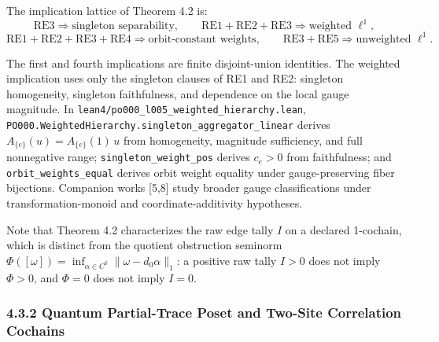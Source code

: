 \documentclass[
  11pt,
]{article}
\begin{document}
The implication lattice of Theorem 4.2 is:
\[
\boxed{\mathrm{RE3}\Rightarrow\text{singleton separability}},
\qquad
\boxed{\mathrm{RE1+RE2+RE3}\Rightarrow\text{weighted }\ell^1},
\]
\[
\boxed{\mathrm{RE1+RE2+RE3+RE4}\Rightarrow
\text{orbit-constant weights}},
\qquad
\boxed{\mathrm{RE3+RE5}\Rightarrow\text{unweighted }\ell^1}.
\]

The first and fourth implications are finite disjoint-union identities. The weighted implication uses only the singleton clauses of RE1 and RE2: singleton homogeneity, singleton faithfulness, and dependence on the local gauge magnitude. In \texttt{lean4/po000\_l005\_weighted\_hierarchy.lean}, \texttt{PO000.WeightedHierarchy.singleton\_aggregator\_linear} derives \(A_{\{e\}}(u)=A_{\{e\}}(1)\,u\) from homogeneity, magnitude sufficiency, and full nonnegative range; \texttt{singleton\_weight\_pos} derives \(c_e>0\) from faithfulness; and \texttt{orbit\_weights\_equal} derives orbit weight equality under gauge-preserving fiber bijections. Companion works {[}5,8{]} study broader gauge classifications under transformation-monoid and coordinate-additivity hypotheses.

Note that Theorem 4.2 characterizes the raw edge tally \(I\) on a declared 1-cochain, which is distinct from the quotient obstruction seminorm \(\Phi([\omega])=\inf_{\alpha\in C^0}\lVert\omega-d_0\alpha\rVert_1\): a positive raw tally \(I>0\) does not imply \(\Phi>0\), and \(\Phi=0\) does not imply \(I=0\).

\subsubsection{4.3.2 Quantum Partial-Trace Poset and Two-Site Correlation Cochains}\label{quantum-partial-trace-poset-and-two-site-correlation-cochains}
\end{document}

